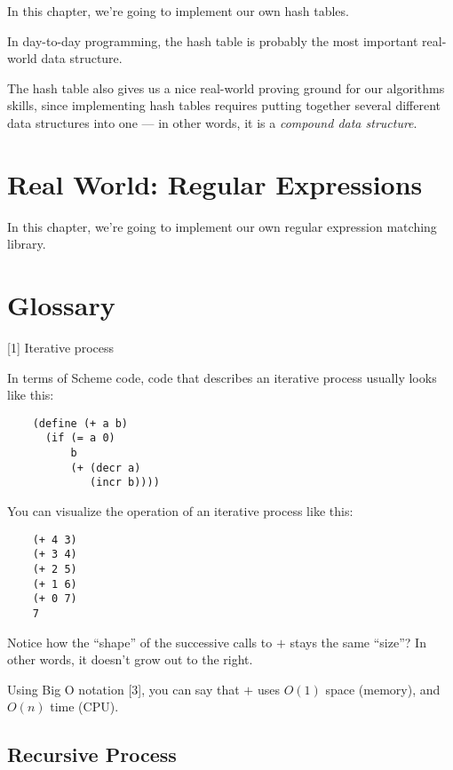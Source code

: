 \documentclass[12pt,openright,draft]{book}
\begin{document}
In this chapter, we're going to implement our own hash tables.

In day-to-day programming, the hash table is probably the most
important real-world data structure.

The hash table also gives us a nice real-world proving ground for our
algorithms skills, since implementing hash tables requires putting
together several different data structures into one --- in other
words, it is a \emph{compound data structure}.


\chapter{Real World: Regular Expressions}

In this chapter, we're going to implement our own regular expression
matching library.


\chapter{Glossary}


[1] Iterative process

In terms of Scheme code, code that describes an iterative process
usually looks like this:

\begin{verbatim}
    (define (+ a b)
      (if (= a 0)
          b
          (+ (decr a)
             (incr b))))
\end{verbatim}

You can visualize the operation of an iterative process like this:

\begin{verbatim}
    (+ 4 3)
    (+ 3 4)
    (+ 2 5)
    (+ 1 6)
    (+ 0 7)
    7
\end{verbatim}

Notice how the ``shape'' of the successive calls to $+$ stays the same
``size''?  In other words, it doesn't grow out to the right.

Using Big O notation [3], you can say that $+$ uses $O(1)$ space
(memory), and $O(n)$ time (CPU).

\section{Recursive Process}
\end{document}
